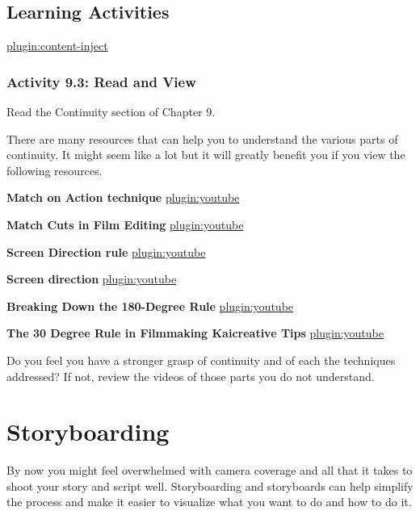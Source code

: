 \documentclass[
]{book}
\begin{document}
\hypertarget{learning-activities-37}{%
\subsection*{Learning Activities}\label{learning-activities-37}}

\href{../_9-3}{plugin:content-inject}

\hypertarget{activity-9.3-read-and-view}{%
\subsubsection*{Activity 9.3: Read and View}\label{activity-9.3-read-and-view}}

Read the Continuity section of Chapter 9.

There are many resources that can help you to understand the various parts of continuity. It might seem like a lot but it will greatly benefit you if you view the following resources.

\textbf{Match on Action technique}
\href{https://www.youtube.com/watch?v=eou7A-e2e4I}{plugin:youtube}

\textbf{Match Cuts in Film Editing}
\href{https://www.youtube.com/watch?v=El28XrjtcMI}{plugin:youtube}

\textbf{Screen Direction rule}
\href{https://www.youtube.com/watch?v=9XOn5uxdSJc}{plugin:youtube}

\textbf{Screen direction}
\href{https://www.youtube.com/watch?v=RogoUz_pk4Y}{plugin:youtube}

\textbf{Breaking Down the 180-Degree Rule}
\href{https://www.youtube.com/watch?v=HinUychY3sE}{plugin:youtube}

\textbf{The 30 Degree Rule in Filmmaking \textbar{} Kaicreative \textbar{} Tips}
\href{https://www.youtube.com/watch?v=1K8EUc98VoQ}{plugin:youtube}

Do you feel you have a stronger grasp of continuity and of each the techniques addressed? If not, review the videos of those parts you do not understand.

\hypertarget{storyboarding}{%
\section*{Storyboarding}\label{storyboarding}}

By now you might feel overwhelmed with camera coverage and all that it takes to shoot your story and script well. Storyboarding and storyboards can help simplify the process and make it easier to visualize what you want to do and how to do it.
\end{document}
